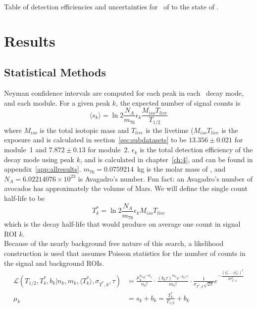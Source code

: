 \documentclass[/main.tex]{subfiles}
\begin{document}
\begin{table}
  \centering
  
  \caption[Detection efficiency summary for \tnbb\ to the  state of ]{\label{tab:bgcutstable}
    Table of detection efficiencies and uncertainties for \tnbb\ of  to the  state of .
  }
\end{table}

\section{Results}


\subsection{Statistical Methods}
Neyman confidence intervals are computed for each peak in each \bbes\ decay mode, and each module.
For a given peak $k$, the expected number of signal counts is
\begin{equation}
  \langle s_k\rangle = \ln2 \frac{N_A}{m_{76}}\epsilon_k\frac{M_{iso}T_{live}}{T_{1/2}}
\end{equation}
where $M_{iso}$ is the total isotopic mass and $T_{live}$ is the livetime ($M_{iso}T_{live}$ is the exposure and is calculated in section~\ref{sec:subdatasets} to be $13.356\pm0.021$ for module~1 and $7.872\pm0.13$ for module~2.
$\epsilon_k$ is the total detection efficiency of the decay mode using peak $k$, and is calculated in chapter~\ref{ch:4}, and can be found in appendix~\ref{app:allresults}.
$m_{76}=0.0759214$~kg is the molar mass of , and $N_A=6.02214076\times10^{23}$ is Avagadro's number.
Fun fact: an Avagadro's number of avocados has approximately the volume of Mars.
We will define the single count half-life to be
\begin{equation}
  T^*_k=\ln2 \frac{N_A}{m_{76}}\epsilon_kM_{iso}T_{live}
\end{equation}
which is the decay half-life that would produce on average one count in signal ROI $k$.
\\
Because of the nearly background free nature of this search, a likelihood construction is used that assumes Poisson statistics for the number of counts in the signal and background ROIs.
\begin{equation}
  \label{eq:rolke}
  \begin{aligned}
    \mathcal{L}(T_{1/2},T^*_k,b_k|n_k,m_k,\langle T^*_k\rangle, \sigma_{T^*,k},\tau)
    &=\frac{\mu_k^{n_k}e^{-\mu_k}}{n_k!} \cdot \frac{(b_k\tau)^{m_k}e^{-b_k/\tau}}{m_k!} \cdot
    \frac{1}{\sigma_{T^*,k}\sqrt{2\pi}}e^{-\frac{(T^*_k-\langle T^*_k\rangle)^2}{2\sigma_{T^*,k}^2}} \\
    \mu_k &= s_k+b_k = \frac{T^*_k}{T_{1/2}} + b_k
  \end{aligned}
\end{equation}
\end{document}
